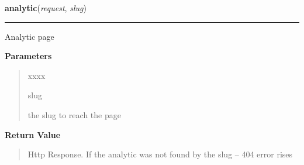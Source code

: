 \hspace{.8\funcindent}\begin{boxedminipage}{\funcwidth}

    \raggedright \textbf{analytic}(\textit{request}, \textit{slug})

    \vspace{-1.5ex}

    \rule{\textwidth}{0.5\fboxrule}
\setlength{\parskip}{2ex}
    Analytic page

\setlength{\parskip}{1ex}
      \textbf{Parameters}
      \vspace{-1ex}

      \begin{quote}
        \begin{Ventry}{xxxx}

          \item[slug]

          the slug to reach the page

        \end{Ventry}

      \end{quote}

      \textbf{Return Value}
    \vspace{-1ex}

      \begin{quote}
      Http Response. If the analytic was not found by the slug -- 404 error
      rises

      \end{quote}

    \end{boxedminipage}

    \label{morbid:views:feature_by_ticket}

    \vspace{0.5ex}

